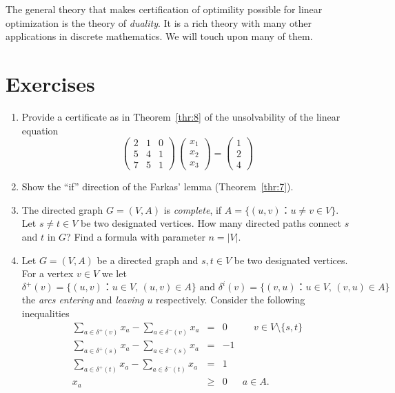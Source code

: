  \bigskip

The general theory that makes certification of optimility possible for linear optimization is the theory of \emph{duality}. It is a rich theory with many other applications in discrete mathematics. We will touch upon many of them.

 




\section*{Exercises}

\begin{enumerate}[1)]
\item Provide a certificate as in Theorem~\ref{thr:8} of the unsolvability of the linear equation 
  \begin{displaymath}
    \begin{pmatrix}
      2 & 1 & 0 \\
      5 & 4 & 1 \\
      7 & 5 & 1
    \end{pmatrix} \,
    \begin{pmatrix}
      x_1 \\ x_2 \\ x_3 
    \end{pmatrix} =
    \begin{pmatrix}
      1\\2\\4
    \end{pmatrix}
  \end{displaymath}
\item Show the ``if'' direction of the Farkas' lemma (Theorem~\ref{thr:7}). 
\item The directed graph $G = (V,A)$ is \emph{complete}, if $A = \{(u,v) ： u≠v ∈ V\}$. Let $s ≠ t ∈V$ be two designated vertices. How many directed paths connect $s$ and $t$ in $G$? Find a formula with parameter $n = |V|$. 
\item Let $G = (V,A)$ be a directed graph and $s,t ∈ V$ be two designated vertices. For a vertex $v ∈ V$ we let
  \begin{displaymath}
    δ^+(v) = \{ (u,v) ： u ∈ V, \, (u,v) ∈A\} \text{ and } δ^i(v) = \{ (v,u) ： u ∈ V, \, (v,u) ∈A\}
  \end{displaymath}
  the \emph{arcs entering} and \emph{leaving} $u$ respectively.  Consider the following inequalities
  \begin{equation} 
    \begin{array}{rclc}      \displaystyle 
    ∑_{a ∈ δ^+(v) } x_a -  ∑_{a ∈ δ^-(v) } x_a & = &  0 & \, \quad v ∈ V \setminus \{s,t\} \\ \displaystyle 
      ∑_{a ∈ δ^+(s) } x_a -  ∑_{a ∈ δ^-(s) } x_a & = &  -1 & \\
      \displaystyle 
      ∑_{a ∈ δ^+(t) } x_a -  ∑_{a ∈ δ^-(t) } x_a & = &  1 & \\
      x_a &≥& 0 & a ∈A.
    \end{array}
    \label{eq:1}
  \end{equation}
  

\end{enumerate}
